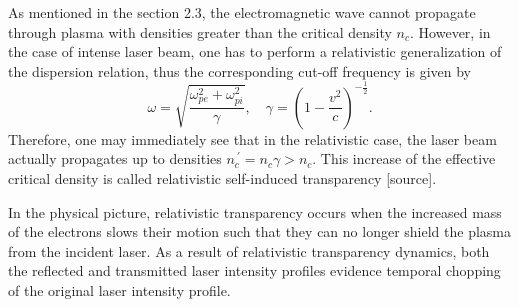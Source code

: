 As mentioned in the section 2.3, the electromagnetic wave cannot propagate through plasma with densities greater than the critical density $ n_c $. However, in the case of intense laser beam, one has to perform a relativistic generalization of the dispersion relation, thus the corresponding cut-off frequency is given by
\begin{equation}
\omega = \sqrt{\frac{\omega_{pe}^2 + \omega_{pi}^2}{\gamma}}, \quad \gamma = \left( 1 - \frac{v^{2}}{c} \right)^{-\frac{1}{2}}.
\end{equation}
Therefore, one may immediately see that in the relativistic case, the laser beam actually propagates up to densities $ n_c^{\: \prime} = n_c \gamma > n_c $. This increase of the effective critical density is called relativistic self-induced transparency [source].

In the physical picture, relativistic transparency occurs when the increased mass of the electrons slows their motion such that they can no longer shield the plasma from the incident laser. As a result of relativistic transparency dynamics, both the reflected and transmitted laser intensity profiles evidence temporal chopping of the original laser intensity profile.
